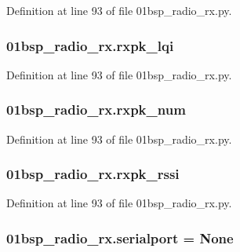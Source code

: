 Definition at line 93 of file 01bsp\+\_\+radio\+\_\+rx.\+py.

\subsubsection[{\texorpdfstring{rxpk\+\_\+lqi}{rxpk_lqi}}]{\setlength{\rightskip}{0pt plus 5cm}01bsp\+\_\+radio\+\_\+rx.\+rxpk\+\_\+lqi}\hypertarget{namespace01bsp__radio__rx_a555c0a333aa1e223a81d28495f6ceb23}{}\label{namespace01bsp__radio__rx_a555c0a333aa1e223a81d28495f6ceb23}


Definition at line 93 of file 01bsp\+\_\+radio\+\_\+rx.\+py.

\subsubsection[{\texorpdfstring{rxpk\+\_\+num}{rxpk_num}}]{\setlength{\rightskip}{0pt plus 5cm}01bsp\+\_\+radio\+\_\+rx.\+rxpk\+\_\+num}\hypertarget{namespace01bsp__radio__rx_a2963f3702c3b835e5b64b2edb9d91378}{}\label{namespace01bsp__radio__rx_a2963f3702c3b835e5b64b2edb9d91378}


Definition at line 93 of file 01bsp\+\_\+radio\+\_\+rx.\+py.

\subsubsection[{\texorpdfstring{rxpk\+\_\+rssi}{rxpk_rssi}}]{\setlength{\rightskip}{0pt plus 5cm}01bsp\+\_\+radio\+\_\+rx.\+rxpk\+\_\+rssi}\hypertarget{namespace01bsp__radio__rx_a5373bfab07d770f91d33b002d6a8f6b1}{}\label{namespace01bsp__radio__rx_a5373bfab07d770f91d33b002d6a8f6b1}


Definition at line 93 of file 01bsp\+\_\+radio\+\_\+rx.\+py.

\subsubsection[{\texorpdfstring{serialport}{serialport}}]{\setlength{\rightskip}{0pt plus 5cm}01bsp\+\_\+radio\+\_\+rx.\+serialport = None}\hypertarget{namespace01bsp__radio__rx_a2e2330ae6124312eb30b14b10d881298}{}\label{namespace01bsp__radio__rx_a2e2330ae6124312eb30b14b10d881298}


